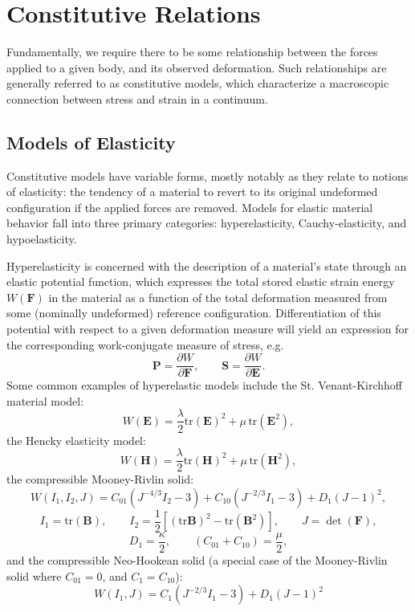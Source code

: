 \section{Constitutive Relations}

Fundamentally, we require there to be some relationship between the forces applied to a given body, and its observed deformation. Such relationships are generally referred to as constitutive models, which characterize a macroscopic connection between stress and strain in a continuum.

\subsection*{Models of Elasticity}

 Constitutive models have variable forms, mostly notably as they relate to notions of elasticity: the tendency of a material to revert to its original undeformed configuration if the applied forces are removed. Models for elastic material behavior fall into three primary categories: hyperelasticity, Cauchy-elasticity, and hypoelasticity.

Hyperelasticity is concerned with the description of a material's state through an elastic potential function, which expresses the total stored elastic strain energy $W (\bm{F})$ in the material as a function of the total deformation measured from some (nominally undeformed) reference configuration. Differentiation of this potential with respect to a given deformation measure will yield an expression for the corresponding work-conjugate measure of stress, e.g.
\begin{equation}
  \bm{P} = \frac{\partial W}{\partial \bm{F}}, \qquad \bm{S} = \frac{\partial W}{\partial \bm{E}}.
\end{equation}
Some common examples of hyperelastic models include the St. Venant-Kirchhoff material model:
\begin{equation}
  W (\bm{E}) = \frac{\lambda}{2} \text{tr} (\bm{E})^2 + \mu \, \text{tr} (\bm{E}^2),
\end{equation}
the Hencky elasticity model:
\begin{equation}
  W (\bm{H}) = \frac{\lambda}{2} \text{tr} (\bm{H})^2 + \mu \, \text{tr} (\bm{H}^2),
\end{equation}
the compressible Mooney-Rivlin solid:
\begin{equation}
  W (I_1, I_2, J) = C_{01} (J^{-4/3} I_2 - 3) + C_{10} (J^{-2/3} I_1 - 3) + D_1 (J - 1)^2,
\end{equation}
\begin{equation}
  I_1 = \text{tr} (\bm{B}), \qquad I_2 = \frac{1}{2} \left[ (\text{tr} \bm{B})^2 - \text{tr} (\bm{B}^2) \right], \qquad J = \det (\bm{F}),
\end{equation}
\begin{equation}
  D_1 = \frac{\kappa}{2}, \qquad (C_{01} + C_{10}) = \frac{\mu}{2},
\end{equation}
and the compressible Neo-Hookean solid (a special case of the Mooney-Rivlin solid where $C_{01} = 0$, and $C_1 = C_{10}$):
\begin{equation}
  W (I_1, J) = C_1 (J^{-2/3} I_1 - 3) + D_1 (J - 1)^2
\end{equation}

